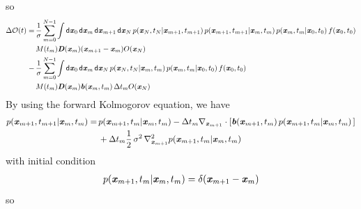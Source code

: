 \documentclass[aip,jcp,a4paper,reprint,onecolumn]{revtex4-1}
\newcommand{\vect}[1]{\textbf{\textit{#1}}}
\newcommand{\dd}{\textsf{d}}
\newcommand{\mo}{\mathcal O}
\begin{document}
so
\begin{align}\nonumber
  \Delta\mo (t) = &\,
  \frac1\sigma
  \sum_{m=0}^{N-1}
  \int \dd \vect x_0\,
  \dd \vect x_m\,
  \dd \vect x_{m+1}\,
  \dd \vect x_N\,
  p(\vect x_N,t_N | \vect x_{m+1}, t_{m+1})\,
  p(\vect x_{m+1}, t_{m+1} | \vect x_{m}, t_{m})\,
  p(\vect x_{m}, t_{m} | \vect x_{0}, t_{0})\,
  f(\vect x_0, t_0)
  \\ \nonumber
  &\,
  M(t_m) \vect D(\vect x_m) (\vect x_{m+1} - \vect x_{m})  
  O(\vect x_N)\\\nonumber
  -
  &\,
  \frac1\sigma
  \sum_{m=0}^{N-1}
  \int \dd \vect x_0\,
  \dd \vect x_m\,
  \dd \vect x_N\,
  p(\vect x_N,t_N | \vect x_{m}, t_{m})\,
  p(\vect x_{m}, t_{m} | \vect x_{0}, t_{0}) \,
  f(\vect x_0, t_0)\\
  &\,
  M(t_m) \vect D(\vect x_m) \vect b(\vect x_m, t_m)\,\Delta t_m
  O(\vect x_N)
\end{align}
By using the forward Kolmogorov equation, we have
\begin{align}\nonumber
  p(\vect x_{m+1},t_{m+1} | \vect x_{m},t_{m} )
  = &\,
  p(\vect x_{m+1},t_{m} | \vect x_{m},t_{m} )
  -
  \Delta t_m
  \nabla_{\vect x_{m+1}}
  \cdot
  [ \vect b(\vect x_{m+1}, t_m)\,
  p(\vect x_{m+1},t_{m} | \vect x_{m},t_{m} )\,]\\
  &\,
  +
  \Delta t_m \frac{1} 2\,\sigma^2\,
  \nabla_{\vect x_{m+1}}^2 p(\vect x_{m+1},t_{m} | \vect x_{m},t_{m} )
\end{align}
with initial condition
\begin{align}
  p(\vect x_{m+1},t_{m} | \vect x_{m},t_{m} ) =
  \delta (\vect x_{m+1} - \vect x_{m})
\end{align}
so
\end{document}
